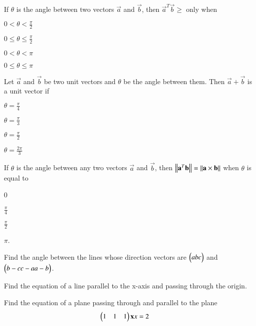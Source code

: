 \item If $\theta$ is the angle between two vectors $\vec{a}$ and $\vec{b}$, then $\vec{a}^T\vec{b} \ge $ only when 
\begin{enumerate}[itemsep = 2pt]
\begin{multicols}{2}
\item $0 < \theta < \frac{\pi}{2}$
\item $0 \le \theta \le \frac{\pi}{2}$
\item $0 < \theta < {\pi}$
\item $0 \le \theta \le {\pi}$
\end{multicols}
\end{enumerate}
\item Let $\vec{a}$ and $\vec{b}$ be two unit vectors and $\theta$ be the angle between them.  Then $\vec{a}+\vec{b}$ is a unit vector if 
\begin{enumerate}[itemsep = 2pt]
\begin{multicols}{2}
\item $\theta = \frac{\pi}{4}$
\item $\theta = \frac{\pi}{3}$
\item $\theta = \frac{\pi}{2}$
\item $\theta = \frac{2\pi}{3}$
\end{multicols}
\end{enumerate}
\item If $\theta$ is the angle between any two vectors $\vec{a}$ and $\vec{b}$, then 
$\left\lVert\mathbf{a}^T\mathbf{b}\right\rVert = \left\lVert\mathbf{a} \times \mathbf{b}\right\rVert$ when $\theta$ is equal to 
\begin{enumerate}[itemsep = 2pt]
\begin{multicols}{2}
\item 0
\item $\frac{\pi}{4}$
\item $\frac{\pi}{2}$
\item $\pi$.
\end{multicols}
\end{enumerate}
\item Find the angle between the lines whose direction vectors are $\begin{pmatrix}abc\end{pmatrix}$ and $\begin{pmatrix}b-cc-aa-b\end{pmatrix}$.
\item Find the equation of a line parallel to the x-axis and passing through the origin.
\item Find the equation of a plane passing through  and parallel to the plane 
%
\begin{align}
\begin{pmatrix}1 & 1 & 1\end{pmatrix}\mathbf{x}{x}&=2
\end{align}
